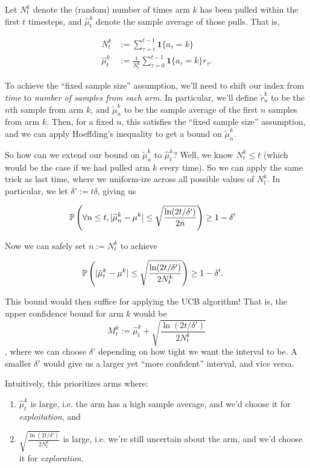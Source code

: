 \documentclass[\main/main]{subfiles}
\begin{document}
Let $N^k_t$ denote the (random) number of times arm $k$ has been pulled within the first $t$ timesteps, and $\hat \mu^k_t$ denote the sample average of those pulls. That is,

\begin{align*}
    N^k_t &:= \sum_{\tau=t}^{t-1} \mathbf{1} \{ a_\tau = k \} \\
    \hat \mu^k_t &:= \frac{1}{N^k_t} \sum_{\tau=0}^{t-1} \mathbf{1} \{ a_\tau = k \} r_\tau.
\end{align*}

To achieve the ``fixed sample size'' assumption, we'll need to shift our index from \emph{time} to \emph{number of samples from each arm}. In particular, we'll define $\tilde r^k_n$ to be the $n$th sample from arm $k$, and $\tilde \mu^k_n$ to be the sample average of the first $n$ samples from arm $k$. Then, for a fixed $n$, this satisfies the ``fixed sample size'' assumption, and we can apply Hoeffding's inequality to get a bound on $\tilde \mu^k_n$.

So how can we extend our bound on $\tilde\mu^k_n$ to $\hat \mu^k_t$? Well, we know $N^k_t \le t$ (which would be the case if we had pulled arm $k$ every time). So we can apply the same trick as last time, where we uniform-ize across all possible values of $N^k_t$. In particular, we let $\delta' := t \delta$, giving us

\begin{align*}
    \P\left( \forall n \le t, |\tilde \mu^k_n - \mu^k | \le \sqrt{\frac{\ln(2t/\delta')}{2n}} \right) &\ge 1-\delta'
\end{align*}

Now we can safely set $n := N^k_t$  to achieve

\begin{align*}
    \P\left( |\hat \mu^k_t - \mu^k | \le \sqrt{\frac{\ln(2t/\delta')}{2N^k_t}} \right) &\ge 1-\delta'.
\end{align*}

This bound would then suffice for applying the UCB algorithm! That is, the upper confidence bound for arm $k$ would be \[ M^k_t := \hat \mu^k_t + \sqrt{\frac{\ln(2t/\delta')}{2N^k_t}} \], where we can choose $\delta'$ depending on how tight we want the interval to be. A smaller $\delta'$ would give us a larger yet ``more confident'' interval, and vice versa.

Intuitively, this prioritizes arms where:

\begin{enumerate}
    \item $\hat \mu^k_t$ is large, i.e. the arm has a high sample average, and we'd choose it for \emph{exploitation}, and
    \item $\sqrt{\frac{\ln(2t/\delta')}{2N^k_t}}$ is large, i.e. we're still uncertain about the arm, and we'd choose it for \emph{exploration}.
\end{enumerate}
\end{document}
